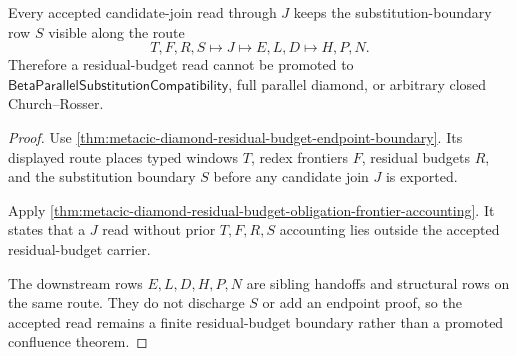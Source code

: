 \begin{theorem}
\label{thm:metacic-diamond-residual-budget-substitution-visibility}
Every accepted candidate-join read through $J$ keeps the substitution-boundary row $S$ visible along the route
$$
T,F,R,S \longmapsto J \longmapsto E,L,D \longmapsto H,P,N .
$$
Therefore a residual-budget read cannot be promoted to $\mathsf{BetaParallelSubstitutionCompatibility}$, full parallel diamond, or arbitrary closed Church--Rosser.
\end{theorem}
\begin{proof}
Use \autoref{thm:metacic-diamond-residual-budget-endpoint-boundary}. Its displayed route places typed windows $T$, redex frontiers $F$, residual budgets $R$, and the substitution boundary $S$ before any candidate join $J$ is exported.

Apply \autoref{thm:metacic-diamond-residual-budget-obligation-frontier-accounting}. It states that a $J$ read without prior $T,F,R,S$ accounting lies outside the accepted residual-budget carrier.

The downstream rows $E,L,D,H,P,N$ are sibling handoffs and structural rows on the same route. They do not discharge $S$ or add an endpoint proof, so the accepted read remains a finite residual-budget boundary rather than a promoted confluence theorem.
\end{proof}

